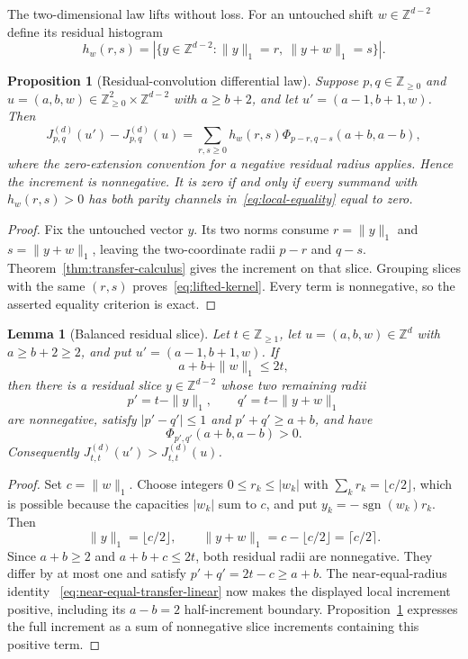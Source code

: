 \documentclass[pdflatex,sn-mathphys-num]{sn-jnl}
\theoremstyle{thmstyleone}
\newtheorem{proposition}[theorem]{Proposition}
\newtheorem{lemma}[theorem]{Lemma}
\theoremstyle{thmstylethree}
\theoremstyle{thmstyletwo}
\newcommand{\Z}{\mathbb Z}
\begin{document}
The two-dimensional law lifts without loss.  For an untouched shift
$w\in\Z^{d-2}$ define its residual histogram
\begin{equation}
 h_w(r,s)=|\{y\in\Z^{d-2}:\|y\|_1=r,\ \|y+w\|_1=s\}|. \label{eq:residual-histogram}
\end{equation}

\begin{proposition}[Residual-convolution differential law]
\label{prop:residual-convolution}
Suppose $p,q\in\Z_{\ge0}$ and
$u=(a,b,w)\in\Z_{\ge0}^2\times\Z^{d-2}$ with $a\ge b+2$, and let
$u'=(a-1,b+1,w)$.  Then
\begin{equation}
 J_{p,q}^{(d)}(u')-J_{p,q}^{(d)}(u)
 =\sum_{r,s\ge0}h_w(r,s)\Phi_{p-r,q-s}(a+b,a-b),       \label{eq:lifted-kernel}
\end{equation}
where the zero-extension convention for a negative residual radius applies.
Hence the increment is
nonnegative.  It is zero if and only if every summand with $h_w(r,s)>0$ has
both parity channels in~\eqref{eq:local-equality} equal to zero.
\end{proposition}

\begin{proof}
Fix the untouched vector $y$.  Its two norms consume $r=\|y\|_1$ and
$s=\|y+w\|_1$, leaving the two-coordinate radii $p-r$ and $q-s$.
Theorem~\ref{thm:transfer-calculus} gives the increment on that slice.
Grouping slices with the same $(r,s)$ proves~\eqref{eq:lifted-kernel}.
Every term is nonnegative, so the asserted equality criterion is exact.
\end{proof}

\begin{lemma}[Balanced residual slice]
\label{lem:balanced-slice}
Let $t\in\Z_{\ge1}$, let $u=(a,b,w)\in\Z^d$ with
$a\ge b+2\ge2$, and put $u'=(a-1,b+1,w)$.  If
\[
 a+b+\|w\|_1\le2t,
\]
then there is a residual slice $y\in\Z^{d-2}$ whose two remaining radii
\[
 p'=t-\|y\|_1,\qquad q'=t-\|y+w\|_1
\]
are nonnegative, satisfy $|p'-q'|\le1$ and
$p'+q'\ge a+b$, and have
\[
 \Phi_{p',q'}(a+b,a-b)>0.
\]
Consequently
$J_{t,t}^{(d)}(u')>J_{t,t}^{(d)}(u)$.
\end{lemma}

\begin{proof}
Set $c=\|w\|_1$.  Choose integers
$0\le r_k\le|w_k|$ with
$\sum_k r_k=\lfloor c/2\rfloor$, which is possible because the capacities
$|w_k|$ sum to $c$, and put
$y_k=-\operatorname{sgn}(w_k)r_k$.  Then
\[
 \|y\|_1=\lfloor c/2\rfloor,\qquad
 \|y+w\|_1=c-\lfloor c/2\rfloor=\lceil c/2\rceil.
\]
Since $a+b\ge2$ and $a+b+c\le2t$, both residual radii are nonnegative.
They differ by at most one and satisfy
$p'+q'=2t-c\ge a+b$.  The near-equal-radius identity
~\eqref{eq:near-equal-transfer-linear} now makes the displayed local
increment positive, including its $a-b=2$ half-increment boundary.
Proposition~\ref{prop:residual-convolution} expresses the full increment as a
sum of nonnegative slice increments containing this positive term.
\end{proof}
\end{document}
